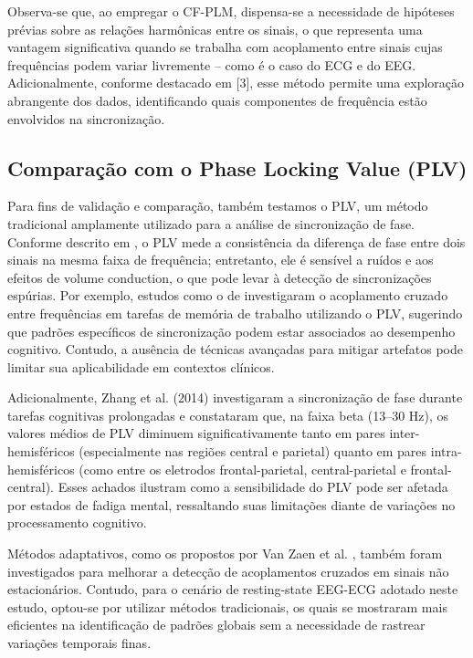 Observa-se que, ao empregar o CF-PLM, dispensa-se a necessidade de hipóteses prévias sobre as relações harmônicas entre os sinais, o que representa uma vantagem significativa quando se trabalha com acoplamento entre sinais cujas frequências podem variar livremente – como é o caso do ECG e do EEG. Adicionalmente, conforme destacado em [3], esse método permite uma exploração abrangente dos dados, identificando quais componentes de frequência estão envolvidos na sincronização.

\subsection{Comparação com o Phase Locking Value (PLV)}

Para fins de validação e comparação, também testamos o PLV, um método tradicional amplamente utilizado para a análise de sincronização de fase. Conforme descrito em \cite{seraj2018cerebral}, o PLV mede a consistência da diferença de fase entre dois sinais na mesma faixa de frequência; entretanto, ele é sensível a ruídos e aos efeitos de volume conduction, o que pode levar à detecção de sincronizações espúrias. Por exemplo, estudos como o de \cite{abubaker2021working} investigaram o acoplamento cruzado entre frequências em tarefas de memória de trabalho utilizando o PLV, sugerindo que padrões específicos de sincronização podem estar associados ao desempenho cognitivo. Contudo, a ausência de técnicas avançadas para mitigar artefatos pode limitar sua aplicabilidade em contextos clínicos.

Adicionalmente, Zhang et al. (2014) \cite{zhang2014phase} investigaram a sincronização de fase durante tarefas cognitivas prolongadas e constataram que, na faixa beta (13--30 Hz), os valores médios de PLV diminuem significativamente tanto em pares inter-hemisféricos (especialmente nas regiões central e parietal) quanto em pares intra-hemisféricos (como entre os eletrodos frontal-parietal, central-parietal e frontal-central). Esses achados ilustram como a sensibilidade do PLV pode ser afetada por estados de fadiga mental, ressaltando suas limitações diante de variações no processamento cognitivo.

Métodos adaptativos, como os propostos por Van Zaen et al. \cite{vanzaen2013adaptive}, também foram investigados para melhorar a detecção de acoplamentos cruzados em sinais não estacionários. Contudo, para o cenário de resting-state EEG-ECG adotado neste estudo, optou-se por utilizar métodos tradicionais, os quais se mostraram mais eficientes na identificação de padrões globais sem a necessidade de rastrear variações temporais finas.

